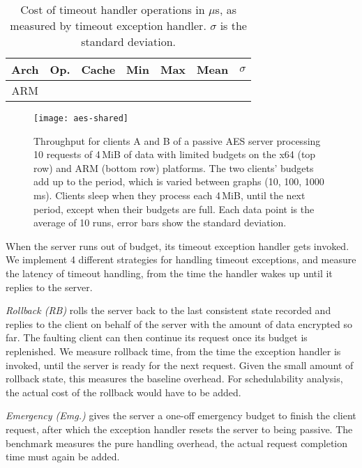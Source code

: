 \begin{table}[t]\centering
\begin{tabular}{|c|l|l|r|r|r|r|}\hline
\textbf{Arch} & \textbf{Op.} & \textbf{Cache} & \textbf{Min} &
                          \textbf{Max} & \textbf{Mean} &
                          \multicolumn{1}{c|}{\boldmath \(\sigma\)} \\\hline
\multirow{8}{*}{ARM}  \hline
\multirow{8}{*}{x64}  \hline
\end{tabular}
\caption{Cost of timeout handler operations in \(\mu\)s, as measured
  by timeout exception handler. \(\sigma\) is the standard deviation.}
\label{t:rollback}
\end{table}

\begin{figure*}[t]
  \centering
  \texttt{[image: aes-shared]}
  \caption{Throughput for clients A and B of a passive AES server processing 10 requests of 4\,MiB of data with
      limited budgets on the x64 (top row) and ARM (bottom row) platforms. The two clients' budgets
      add up to the period, which is varied between graphs (10, 100, 1000\,ms). Clients sleep when
      they process each 4\,MiB, until the next period, except when their budgets are full. Each data point is the average of 10 runs, error bars show the standard deviation.}
  \label{f:aes}
\end{figure*}

When the server runs out of budget, its timeout exception handler gets
invoked. We implement 4 different strategies for handling timeout exceptions,
and measure the latency of timeout handling, from the time the handler wakes up
until it replies to the server.

\emph{Rollback (RB)} rolls the server back to the last consistent state
recorded and replies to the client on behalf of the server with the amount of data
encrypted so far. The faulting client can then continue its request once its budget is replenished.
We measure rollback time, from the time the exception handler is
invoked, until the server is ready for the next request. Given the
small amount of rollback state, this measures the baseline
overhead. For schedulability analysis, the actual cost of the rollback would
have to be added.

\emph{Emergency (Emg.)} gives the server a one-off emergency budget to finish
the client request, after which the exception handler
resets the server to being passive. The benchmark measures the
pure handling overhead, the actual request completion time must again be added.

